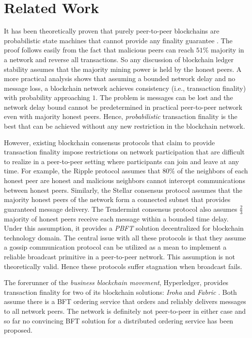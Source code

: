 \section{Related Work}
\label{s-related-work}
It has been theoretically proven that purely peer-to-peer blockchains are probabilistic state machines that cannot provide any finality guarantee \cite{7756226}. The proof follows easily from the fact that malicious peers can reach $51\%$ majority in a network and reverse all transactions. So any discussion of blockchain ledger stability assumes that the majority mining power is held by the honest peers. A more practical analysis \cite{10.1007/978-3-319-56614-6_22} shows that assuming a bounded network delay and no message loss, a blockchain network achieves consistency (i.e., transaction finality) with probability approaching $1$. The problem is messages can be lost and the network delay bound cannot be predetermined in practical peer-to-peer network even with majority honest peers. Hence, \textit{probabilistic} transaction finality is the best that can be achieved without any new restriction in the blockchain network.

However, existing blockchain consensus protocols that claim to provide transaction finality impose restrictions on network participation that are difficult to realize in a peer-to-peer setting where participants can join and leave at any time. For example, the Ripple \cite{David2014TheRP} protocol assumes that $80\%$ of the neighbors of each honest peer are honest and malicious neighbors cannot intercept communications between honest peers. Similarly, the Stellar consensus protocol \cite{thestellar} assumes that the majority honest peers of the network form a connected subnet that provides guaranteed message delivery. The Tendermint consensus protocol \cite{Buchman2018TheLG} also assumes $\frac{2}{3}$ majority of honest peers receive each message within a bounded time delay. Under this assumption, it provides a \textit{PBFT} \cite{Castro:1999:PBF:296806.296824} solution decentralized for blockchain technology domain. The central issue with all these protocols is that they assume a gossip communication protocol \cite{gossip} can be utilized as a mean to implement a reliable broadcast primitive \cite{Jalote:1994:FTD:179250} in a peer-to-peer network. This assumption is not theoretically valid. Hence these protocols suffer stagnation when broadcast fails.          

The forerunner of the \textit{business blockchain movement}, Hyperledger, provides transaction finality for two of its blockchain solutions: \textit{Iroha} \cite{yac} and \textit{Fabric} \cite{patent:20180150799}. Both assume there is a BFT ordering service that orders and reliably delivers messages to all network peers. The network is definitely not peer-to-peer in either case and so far no convincing BFT solution for a distributed ordering service has been proposed. 

